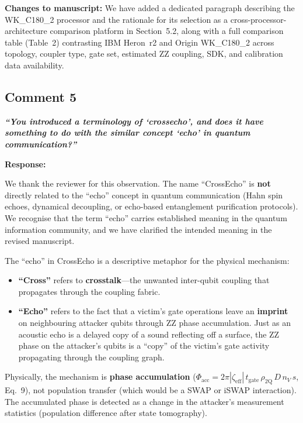 \documentclass[11pt,a4paper]{article}
\begin{document}
\medskip\noindent\textbf{Changes to manuscript:} We have added a dedicated paragraph
describing the WK\_C180\_2 processor and the rationale for its selection as a
cross-processor-architecture comparison platform in Section~5.2, along with a full
comparison table (Table~2) contrasting IBM Heron~r2 and Origin WK\_C180\_2 across
topology, coupler type, gate set, estimated ZZ coupling, SDK, and calibration data
availability.

\subsection*{Comment 5}

\noindent\textbf{\textit{``You introduced a terminology of `crossecho', and does it have
something to do with the similar concept `echo' in quantum communication?''}}

\medskip\noindent\textbf{Response:}

We thank the reviewer for this observation. The name ``CrossEcho'' is \textbf{not}
directly related to the ``echo'' concept in quantum communication (Hahn spin echoes,
dynamical decoupling, or echo-based entanglement purification protocols). We recognise
that the term ``echo'' carries established meaning in the quantum information community,
and we have clarified the intended meaning in the revised manuscript.

The ``echo'' in CrossEcho is a descriptive metaphor for the physical mechanism:
\begin{itemize}[leftmargin=*]
    \item \textbf{``Cross''} refers to \textbf{crosstalk}---the unwanted inter-qubit
    coupling that propagates through the coupling fabric.
    \item \textbf{``Echo''} refers to the fact that a victim's gate operations leave an
    \textbf{imprint} on neighbouring attacker qubits through ZZ phase accumulation. Just
    as an acoustic echo is a delayed copy of a sound reflecting off a surface, the ZZ
    phase on the attacker's qubits is a ``copy'' of the victim's gate activity propagating
    through the coupling graph.
\end{itemize}

Physically, the mechanism is \textbf{phase accumulation}
($\Phi_{\mathrm{acc}} = 2\pi|\zeta_{\mathrm{eff}}|\,t_{\mathrm{gate}}\,\rho_{\mathrm{2Q}}\,D\,n_V\,s$,
Eq.~9), not population transfer (which would be a SWAP or iSWAP interaction). The
accumulated phase is detected as a change in the attacker's measurement statistics
(population difference after state tomography).
\end{document}
